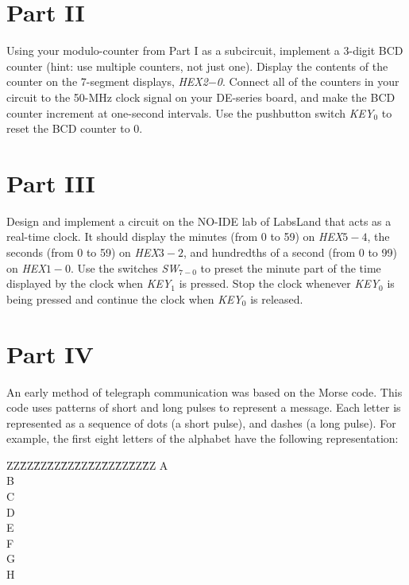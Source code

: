 \documentclass[epsfig,10pt,fullpage]{article}
\begin{document}
\section*{Part II}
Using your modulo-counter from Part I as a subcircuit, 
implement a 3-digit BCD counter (hint: use multiple counters, not just one). Display the
contents of the counter on the 7-segment displays, {\it HEX2$-$0}. Connect all of the counters
in your circuit to the 50-MHz clock signal on your DE-series board, and make the BCD counter
increment at one-second intervals.
Use the pushbutton switch {\it KEY}$_0$ to reset the BCD counter to 0.

\section*{Part III}
Design and implement a circuit on the NO-IDE lab of LabsLand that acts as a real-time clock.
It should display the minutes (from 0 to 59) on {\it HEX$5-4$}, the seconds (from 0 to 59)
on {\it HEX$3-2$}, and hundredths of a second (from 0 to 99) on {\it HEX}$1-0$. Use the 
switches {\it SW}$_{7-0}$ to preset the minute 
part of the time displayed by the clock when {\it KEY}$_1$ is pressed.
Stop the clock whenever {\it KEY}$_0$ is being pressed and continue the clock when 
{\it KEY}$_0$ is released.

\section*{Part IV}
An early method of telegraph communication was based on the Morse code. This code uses 
patterns of short and long pulses to represent a message. Each letter is represented as a 
sequence of dots (a short pulse), and dashes (a long pulse). For example, the first eight 
letters of the alphabet have the following representation:

\begin{table}[H]
\begin{center}
\begin{minipage}[t]{12.5 cm}
\begin{tabbing}
ZZ\=ZZ\=ZZ\=ZZ\=ZZ\=ZZ\=ZZ\=ZZ\=ZZ\=ZZ\=ZZ\kill
\>A\>\>{\bf $\bullet$  ---}\\
\>B\>\>{\bf ---  $\bullet$  $\bullet$  $\bullet$}\\
\>C\>\>{\bf ---  $\bullet$  ---  $\bullet$}\\
\>D\>\>{\bf ---  $\bullet$  $\bullet$}\\
\>E\>\>{\bf $\bullet$}\\
\>F\>\>{\bf $\bullet$  $\bullet$  ---  $\bullet$}\\
\>G\>\>{\bf ---  ---  $\bullet$}\\
\>H\>\>{\bf $\bullet$  $\bullet$  $\bullet$  $\bullet$}\\
\end{tabbing}
\end{minipage}
\end{center}
\end{table}
\end{document}

